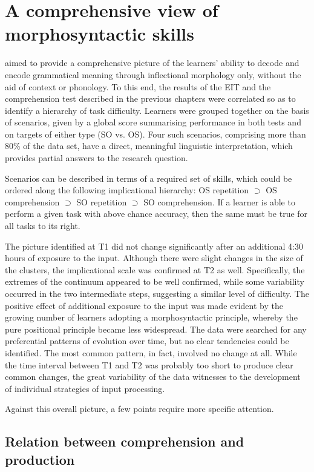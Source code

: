 \section{A comprehensive view of morphosyntactic skills}\label{sec:08:4}

 aimed to provide a comprehensive picture of the learners’ ability to decode and encode grammatical meaning through inflectional morphology only, without the aid of context or phonology. To this end, the results of the EIT and the comprehension test described in the previous chapters were correlated so as to identify a hierarchy of task difficulty. Learners were grouped together on the basis of scenarios, given by a global score summarising performance in both tests and on targets of either type (SO vs. OS). Four such scenarios, comprising more than 80\% of the data set, have a direct, meaningful linguistic interpretation, which provides partial answers to the research question. 

Scenarios can be described in terms of a required set of skills, which could be ordered along the following implicational hierarchy: OS repetition ${\supset}$ OS comprehension ${\supset}$ SO repetition ${\supset}$ SO comprehension. If a learner is able to perform a given task with above chance accuracy, then the same must be true for all tasks to its right. 

The picture identified at T1 did not change significantly after an additional 4:30 hours of exposure to the input. Although there were slight changes in the size of the clusters, the implicational scale was confirmed at T2 as well. Specifically, the extremes of the continuum appeared to be well confirmed, while some variability occurred in the two intermediate steps, suggesting a similar level of difficulty. The positive effect of additional exposure to the input was made evident by the growing number of learners adopting a morphosyntactic principle, whereby the pure positional principle became less widespread. The data were searched for any preferential patterns of evolution over time, but no clear tendencies could be identified. The most common pattern, in fact, involved no change at all. While the time interval between T1 and T2 was probably too short to produce clear common changes, the great variability of the data witnesses to the development of individual strategies of input processing.

Against this overall picture, a few points require more specific attention. 

\subsection{Relation between comprehension and production}\label{sec:08:4.1}

